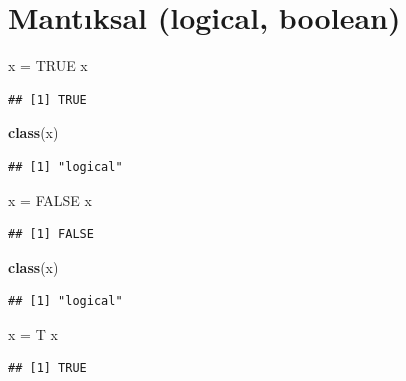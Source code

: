 \documentclass[]{book}
\newenvironment{Shaded}{\begin{snugshade}}{\end{snugshade}}
\newcommand{\KeywordTok}[1]{\textcolor[rgb]{0.13,0.29,0.53}{\textbf{#1}}}
\newcommand{\NormalTok}[1]{#1}
\newcommand{\OtherTok}[1]{\textcolor[rgb]{0.56,0.35,0.01}{#1}}
\newcommand{\StringTok}[1]{\textcolor[rgb]{0.31,0.60,0.02}{#1}}
\begin{document}
\hypertarget{mantksal-logical-boolean}{%
\section{Mantıksal (logical, boolean)}\label{mantksal-logical-boolean}}

\begin{Shaded}
\begin{Highlighting}[]
\NormalTok{x =}\StringTok{ }\OtherTok{TRUE}
\NormalTok{x}
\end{Highlighting}
\end{Shaded}

\begin{verbatim}
## [1] TRUE
\end{verbatim}

\begin{Shaded}
\begin{Highlighting}[]
\KeywordTok{class}\NormalTok{(x)}
\end{Highlighting}
\end{Shaded}

\begin{verbatim}
## [1] "logical"
\end{verbatim}

\begin{Shaded}
\begin{Highlighting}[]
\NormalTok{x =}\StringTok{ }\OtherTok{FALSE}
\NormalTok{x}
\end{Highlighting}
\end{Shaded}

\begin{verbatim}
## [1] FALSE
\end{verbatim}

\begin{Shaded}
\begin{Highlighting}[]
\KeywordTok{class}\NormalTok{(x)}
\end{Highlighting}
\end{Shaded}

\begin{verbatim}
## [1] "logical"
\end{verbatim}

\begin{Shaded}
\begin{Highlighting}[]
\NormalTok{x =}\StringTok{ }\NormalTok{T}
\NormalTok{x}
\end{Highlighting}
\end{Shaded}

\begin{verbatim}
## [1] TRUE
\end{verbatim}
\end{document}
